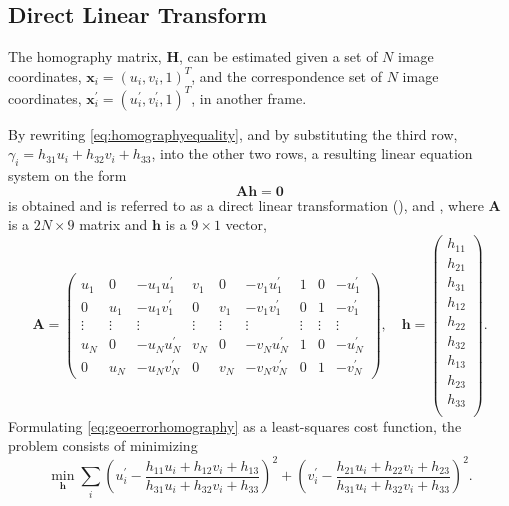\subsection{Direct Linear Transform}
The homography matrix, $\bm{H}$, can be estimated given a set of $N$ image coordinates, $\bm{x}_i = (u_i, v_i, 1)^T$, and the correspondence set of $N$ image coordinates, $\bm{x}^\prime_i = (u^\prime_i, v^\prime_i, 1)^T$, in another frame.

By rewriting \eqref{eq:homographyequality}, and by substituting the third row, $\gamma_i = h_{31}u_i + h_{32}v_i + h_{33}$, into the other two rows, a resulting linear equation system on the form
%
\begin{equation}
	\label{eq:geoerrorhomography}
	\bm{A} \bm{h} = \bm{0}
\end{equation}
%
is obtained and is referred to as a direct linear transformation (\abbrDLT), \eg \cite{Hartley:2004} and \cite{Nordberg:2015}, where $\bm{A}$ is a $2 N \times 9$ matrix and $\bm{h}$ is a $9 \times 1$ vector,
%
\begin{equation}
	\bm{A} =
	\begin{pmatrix}
		u_1 & 0 & -u_1 u_1^\prime & v_1 & 0 & - v_1 u_1^\prime & 1 & 0 & -u_1^\prime \\
		0 & u_1 & -u_1 v_1^\prime & 0 & v_1 & - v_1 v_1^\prime & 0 & 1 & -v_1^\prime \\
		\vdots & \vdots & \vdots & \vdots & \vdots & \vdots & \vdots & \vdots & \vdots \\
		u_N & 0 & -u_N u_N^\prime & v_N & 0 & - v_N u_N^\prime & 1 & 0 & -u_N^\prime \\
		0 & u_N & -u_N v_N^\prime & 0 & v_N & - v_N v_N^\prime & 0 & 1 & -v_N^\prime
	\end{pmatrix}
	,
	\quad
	\bm{h} =
	\begin{pmatrix}
		h_{11} \\
		h_{21} \\
		h_{31} \\
		h_{12} \\
		h_{22} \\
		h_{32} \\
		h_{13} \\
		h_{23} \\
		h_{33} \\
	\end{pmatrix}
	.
\end{equation}
%
Formulating \eqref{eq:geoerrorhomography} as a least-squares cost function, the problem consists of minimizing
%
\begin{equation}
	\min_{\bm{h}} \sum_i
	\left( u^\prime_i - \frac{h_{11}u_i + h_{12}v_i + h_{13}}{h_{31}u_i + h_{32}v_i + h_{33}} \right)^2 +
	\left( v^\prime_i - \frac{h_{21}u_i + h_{22}v_i + h_{23}}{h_{31}u_i + h_{32}v_i + h_{33}} \right)^2.
\end{equation}

